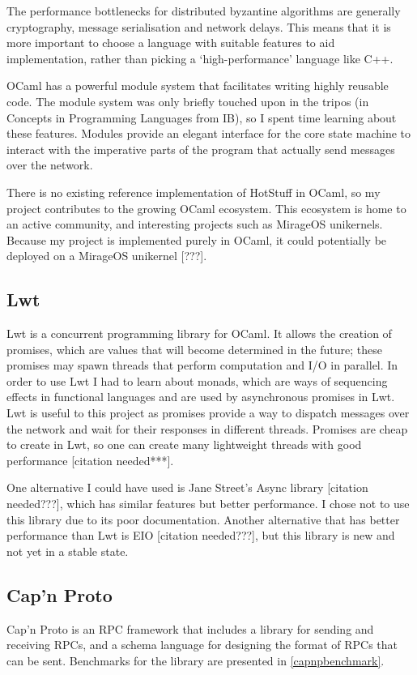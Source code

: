 The performance bottlenecks for distributed byzantine algorithms are generally cryptography, message serialisation and network delays. This means that it is more important to choose a language with suitable features to aid implementation, rather than picking a `high-performance' language like C++.

OCaml has a powerful module system that facilitates writing highly reusable code. The module system was only briefly touched upon in the tripos (in Concepts in Programming Languages from IB), so I spent time learning about these features. Modules provide an elegant interface for the core state machine to interact with the imperative parts of the program that actually send messages over the network.

There is no existing reference implementation of HotStuff in OCaml, so my project contributes to the growing OCaml ecosystem. This ecosystem is home to an active community, and interesting projects such as MirageOS unikernels. Because my project is implemented purely in OCaml, it could potentially be deployed on a MirageOS unikernel [???].

\subsection{Lwt}
Lwt is a concurrent programming library for OCaml. It allows the creation of promises, which are values that will become determined in the future; these promises may spawn threads that perform computation and I/O in parallel. In order to use Lwt I had to learn about monads, which are ways of sequencing effects in functional languages and are used by asynchronous promises in Lwt. Lwt is useful to this project as promises provide a way to dispatch messages over the network and wait for their responses in different threads. Promises are cheap to create in Lwt, so one can create many lightweight threads with good performance [citation needed***].

One alternative I could have used is Jane Street's Async library [citation needed???], which has similar features but better performance. I chose not to use this library due to its poor documentation. Another alternative that has better performance than Lwt is EIO [citation needed???], but this library is new and not yet in a stable state.

\subsection{Cap'n Proto}
Cap'n Proto is an RPC framework that includes a library for sending and receiving RPCs, and a schema language for designing the format of RPCs that can be sent. Benchmarks for the library are presented in \ref{capnpbenchmark}.

